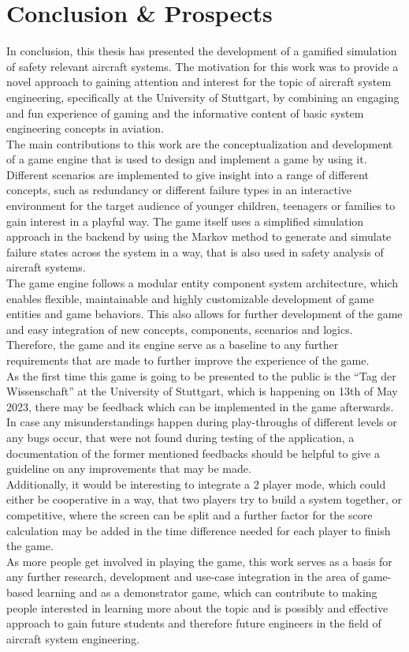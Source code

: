 \chapter{Conclusion \& Prospects}\label{ch:conclusion-&-prospects}
In conclusion, this thesis has presented the development of a gamified simulation of safety relevant aircraft systems.
The motivation for this work was to provide a novel approach to gaining attention and interest for the topic of aircraft
system engineering, specifically at the University of Stuttgart, by combining an engaging and fun experience of gaming and the
informative content of basic system engineering concepts in aviation.
\\
The main contributions to this work are the conceptualization and development of a game engine that is used to
design and implement a game by using it.
Different scenarios are implemented to give insight into a range of different concepts, such as redundancy or different failure types in an
interactive environment for the target audience of younger children, teenagers or families to gain interest in a playful way.
The game itself uses a simplified simulation approach in the backend by using the Markov method to generate and simulate failure states
across the system in a way, that is also used in safety analysis of aircraft systems.
\\
The game engine follows a modular entity component system architecture, which enables flexible, maintainable and highly customizable
development of game entities and game behaviors.
This also allows for further development of the game and easy integration of new concepts, components, scenarios and logics.
Therefore, the game and its engine serve as a baseline to any further requirements that are made to further improve the experience of the game.
\\
As the first time this game is going to be presented to the public is the ``Tag der Wissenschaft'' at the University of Stuttgart, which is happening
on 13th of May 2023, there may be feedback which can be implemented in the game afterwards.
In case any misunderstandings happen during play-throughs of different levels or any bugs occur, that were not found during testing of
the application, a documentation of the former mentioned feedbacks should be helpful to give a guideline on any improvements that may be made.
\\
Additionally, it would be interesting to integrate a 2 player mode, which could either be cooperative in a way, that two players
try to build a system together, or competitive, where the screen can be split and a further factor for the score calculation may be added in the time difference
needed for each player to finish the game.
\\
As more people get involved in playing the game, this work serves as a basis for any further research, development and use-case integration in the area
of game-based learning and as a demonstrator game, which can contribute to making people interested in learning more about the topic and is possibly and effective
approach to gain future students and therefore future engineers in the field of aircraft system engineering.